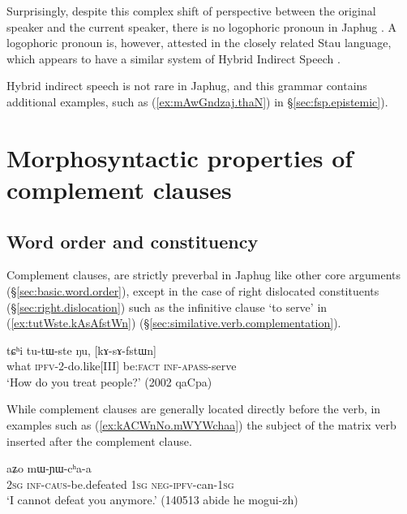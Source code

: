 Surprisingly, despite this complex shift of perspective between the original speaker and the current speaker, there is no logophoric pronoun in Japhug \citep{hagege74logophoriques, nikitina12logophoric}. A logophoric pronoun is, however, attested in the closely related Stau language, which appears to have a similar system of Hybrid Indirect Speech \citep{jacques17stau}.

Hybrid indirect speech is not rare in Japhug, and this grammar contains additional examples, such as  (\ref{ex:mAwGndzaj.thaN}) in §\ref{sec:fsp.epistemic}).



\section{Morphosyntactic properties of complement clauses}  \label{sec:complement.morphosyntax}
\subsection{Word order and constituency}  \label{sec:complement.word.order}
 
Complement clauses, are strictly preverbal in Japhug like other core arguments (§\ref{sec:basic.word.order}), except in the case of right dislocated constituents (§\ref{sec:right.dislocation}) such as the infinitive clause  `to serve' in (\ref{ex:tutWste.kAsAfstWn}) (§\ref{sec:similative.verb.complementation}).

\begin{exe}
\ex \label{ex:tutWste.kAsAfstWn}
\gll tɕʰi tu-tɯ-ste ŋu, [kɤ-sɤ-fstɯn]\\
what \textsc{ipfv}-2-do.like[III] be:\textsc{fact} \textsc{inf}-\textsc{apass}-serve \\
\glt `How do you treat people?' (2002 qaCpa)
\end{exe}

While complement clauses are generally located directly before the verb, in examples such as (\ref{ex:kACWnNo.mWYWchaa}) the subject of the matrix verb inserted after the complement clause.

\begin{exe}
\ex \label{ex:kACWnNo.mWYWchaa}
 aʑo mɯ-ɲɯ-cʰa-a \\
\textsc{2sg} \textsc{inf}-\textsc{caus}-be.defeated \textsc{1sg} \textsc{neg}-\textsc{ipfv}-can-\textsc{1sg} \\
\glt `I cannot defeat you anymore.' (140513 abide he mogui-zh)
\end{exe}

